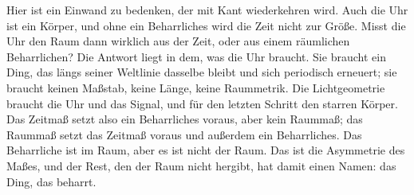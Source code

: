 Hier ist ein Einwand zu bedenken, der mit Kant wiederkehren wird. Auch die Uhr ist ein Körper, und ohne ein Beharrliches wird die Zeit nicht zur Größe. Misst die Uhr den Raum dann wirklich aus der Zeit, oder aus einem räumlichen Beharrlichen? Die Antwort liegt in dem, was die Uhr braucht. Sie braucht ein Ding, das längs seiner Weltlinie dasselbe bleibt und sich periodisch erneuert; sie braucht keinen Maßstab, keine Länge, keine Raummetrik. Die Lichtgeometrie braucht die Uhr und das Signal, und für den letzten Schritt den starren Körper. Das Zeitmaß setzt also ein Beharrliches voraus, aber kein Raummaß; das Raummaß setzt das Zeitmaß voraus und außerdem ein Beharrliches. Das Beharrliche ist im Raum, aber es ist nicht der Raum. Das ist die Asymmetrie des Maßes, und der Rest, den der Raum nicht hergibt, hat damit einen Namen: das Ding, das beharrt.
